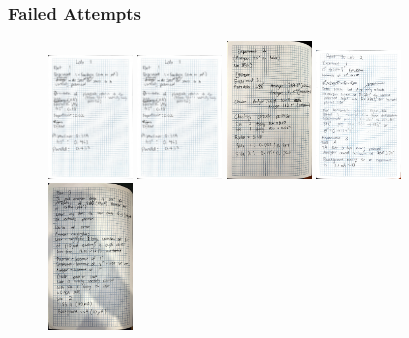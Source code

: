 \documentclass{article}
\begin{document}
\subsubsection{Failed Attempts}
\begin{figure}[H]
    \centering
    \includegraphics[width=0.2\textwidth]{labbook1.jpg}
    \hspace{0.5cm}
    \includegraphics[width=0.2\textwidth]{labbook1.jpg}
    \vspace{0.5cm}
    \includegraphics[width=0.2\textwidth]{labbook2.jpg}
    \hspace{0.5cm}
    \includegraphics[width=0.2\textwidth]{labbook4.jpg}
    \vspace{0.5cm}
    \includegraphics[width=0.2\textwidth]{labbook3.jpg}

\end{figure}
\end{document}
